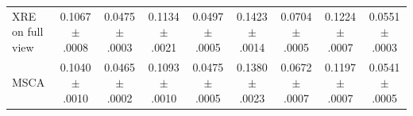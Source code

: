 \begin{table}[!t]
\begin{tabular}{lcccccccc}
XRE on full view & 0.1067{\tiny$\pm$.0008} & 0.0475{\tiny$\pm$.0003} & 0.1134{\tiny$\pm$.0021} & 0.0497{\tiny$\pm$.0005} & 0.1423{\tiny$\pm$.0014} & 0.0704{\tiny$\pm$.0005} & 0.1224{\tiny$\pm$.0007} & 0.0551{\tiny$\pm$.0003} \\
MSCA & 0.1040{\tiny$\pm$.0010} & 0.0465{\tiny$\pm$.0002} & 0.1093{\tiny$\pm$.0010} & 0.0475{\tiny$\pm$.0005} & 0.1380{\tiny$\pm$.0023} & 0.0672{\tiny$\pm$.0007} & 0.1197{\tiny$\pm$.0007} & 0.0541{\tiny$\pm$.0005} \\
\bottomrule
\end{tabular}
\end{table}
